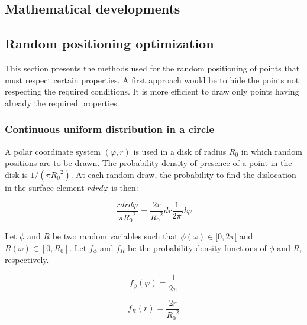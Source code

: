 \nocite{*}

\begin{appendix}

\section{Mathematical developments}

\subsection{Random positioning optimization}

This section presents the methods used for the random positioning of points that must respect certain properties.
A first approach would be to hide the points not respecting the required conditions.
It is more efficient to draw only points having already the required properties.

\subsubsection{Continuous uniform distribution in a circle}\label{sec:circle-random-position}

A polar coordinate system \( (\varphi, r) \) is used in a disk of radius \( R_0 \) in which random positions are to be drawn.
The probability density of presence of a point in the disk is \( 1 / \left( \pi {R_0}^2 \right) \).
At each random draw, the probability to find the dislocation in the surface element \( r dr d\varphi\) is then:

\begin{equation}
  \frac{r dr d\varphi}{\pi {R_0}^2} =
    \frac{2 r}{{R_0}^2} dr \frac{1}{2 \pi} d\varphi
\end{equation}

\bigskip

Let \( \phi \) and \( R \) be two random variables such that \( \phi(\omega) \in [0, 2\pi[ \) and \( R(\omega) \in [0, R_0] \). Let \( f_\phi \) and \( f_R \) be the probability density functions of \( \phi \) and \( R \), respectively.

\begin{equation}
  f_\phi(\varphi) =
    \frac{1}{2 \pi}
\end{equation}

\begin{equation}
  f_R(r) =
    \frac{2r}{{R_0}^2}
\end{equation}

\medskip


\end{appendix}
